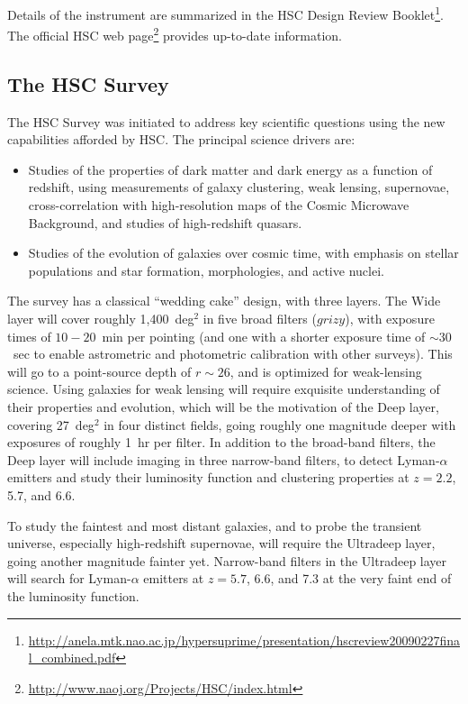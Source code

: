 \documentclass[12pt]{article}
\begin{document}
Details of the instrument are summarized in the HSC Design Review
Booklet\footnote{\url{http://anela.mtk.nao.ac.jp/hypersuprime/presentation/hscreview20090227final_combined.pdf}}. The
official HSC web page\footnote{\url{http://www.naoj.org/Projects/HSC/index.html}} provides up-to-date
information.

\subsection{The HSC Survey}


The HSC Survey was initiated to address key scientific questions using the new capabilities afforded by HSC.
The principal science drivers are:
\begin{itemize}
\item Studies of the properties of dark matter and dark energy as a
  function of redshift, using measurements of galaxy clustering, weak
  lensing, supernovae, cross-correlation with high-resolution maps
  of the Cosmic Microwave Background, and studies of high-redshift
  quasars.
\item Studies of the evolution of galaxies over cosmic time, with
  emphasis on stellar populations and star formation, morphologies, and
  active nuclei.
\end{itemize}

The survey has a classical ``wedding cake'' design, with three layers.  The Wide layer will cover roughly
1,400~deg$^2$ in five broad filters ($grizy$), with exposure times of $10-20$~min per pointing (and one with a
shorter exposure time of $\sim 30$~sec to enable astrometric and photometric calibration with other surveys).
This will go to a point-source depth of $r\sim 26$, and is optimized for weak-lensing science.  Using galaxies
for weak lensing will require exquisite understanding of their properties and evolution, which will be the
motivation of the Deep layer, covering 27~deg$^2$ in four distinct fields, going roughly one magnitude deeper
with exposures of roughly 1~hr per filter.  In addition to the broad-band filters, the Deep layer will include
imaging in three narrow-band filters, to detect Lyman-$\alpha$ emitters and study their luminosity function
and clustering properties at $z = 2.2$, 5.7, and 6.6.

To study the faintest and most distant galaxies, and to probe the
transient universe, especially high-redshift supernovae, will require
the Ultradeep layer, going another magnitude fainter yet.  Narrow-band
filters in the Ultradeep layer will search for Lyman-$\alpha$
emitters at $z = 5.7$, 6.6, and 7.3 at the very faint end of the
luminosity function.
\end{document}
